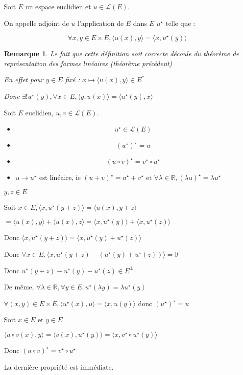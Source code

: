 \documentclass[a4paper,12pt]{book}
\newcommand{\Def}[2]{\begin{tcolorbox}[sharp corners, colback=white,colframe=blue!90!black!75, title=Définition : #1]#2\end{tcolorbox}}
\newcommand{\Prop}[2]{\begin{tcolorbox}[sharp corners, colback=white,colframe=red!90!black!75, title=Proposition : #1]#2\end{tcolorbox}}
\newcommand{\Pre}[1]{\begin{tcolorbox}[sharp corners, colback=white,colframe=green!60!green!30!black!75, title=Preuve]#1\end{tcolorbox}}
\newtheorem{Rem}{Remarque}[section]
\def\R{\mathbb{R}}
\begin{document}
\Def{Adjoint}{Soit $E$ un espace euclidien et $u\in\mathcal{L}(E)$.
\par On appelle adjoint de $u$ l'application de $E$ dans $E$ $u^\star$ telle que :
\par $$\forall x,y\in E\times E, \langle u(x), y \rangle = \langle x, u^\star(y)\rangle$$}
\begin{Rem}
Le fait que cette définition soit correcte découle du théorème de représentation des formes linéaires (théorème précédent)
\par En effet pour $y\in E$ fixé : $x\mapsto \langle u(x), y\rangle\in E^*$
\par Donc $\exists! u^\star(y), \forall x\in E, \langle y, u(x)\rangle = \langle u^\star(y), x\rangle$
\end{Rem}
\Prop{propriétés de l'ajdoint}{Soit $E$ euclidien, $u,v\in\mathcal{L}(E)$.\begin{itemize}
\item $$u^\star\in\mathcal{L}(E)$$
\item $$(u^\star)^\star = u$$
\item $$(u\circ v)^\star =v^\star \circ u^\star$$
\item $u\to u^\star$ est linéaire, ie $(u+v)^\star = u^\star + v^\star$ et $\forall \lambda\in\R, (\lambda u)^\star = \lambda u^\star$
\end{itemize}}
\Pre{$y,z\in E$
\par Soit $x\in E, \langle x, u^\star(y+z)\rangle = \langle u(x), y+z\rangle$
\par $ = \langle u(x), y\rangle + \langle u(x), z\rangle = \langle x, u^\star(y)\rangle + \langle x, u^\star(z)\rangle$
\par Donc $\langle x, u^\star(y+z)\rangle = \langle x, u^\star(y)+u^\star(z)\rangle$
\par Donc $\forall x\in E, \langle x, u^\star (y+z) - (u^\star(y)+u^\star(z)) \rangle =0$
\par Donc $u^\star(y+z) - u^\star(y) - u^\star(z) \in E^\perp$
\par De même, $\forall \lambda\in\R,\forall y\in E, u^\star(\lambda y) = \lambda u^\star(y)$
\par $\forall (x,y)\in E\times E, \langle u^\star(x), u\rangle = \langle x, u(y)\rangle$ donc $(u^\star)^\star = u$
\par Soit $x\in E$ et $y\in E$
\par $\langle u\circ v(x), y\rangle = \langle v(x), u^\star(y)\rangle = \langle x, v^\star\circ u^\star(y)\rangle$
\par Donc $(u\circ v)^\star = v^\star\circ u^\star$
\par La dernière propriété est immédiate.}
\end{document}
